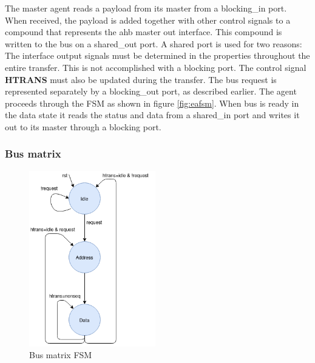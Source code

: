 The master agent reads a payload from its master from a blocking\_in port. When received,  the payload is added together with other control signals to a compound that represents the ahb master out interface. This compound is written to the bus on a shared\_out port. A shared port is used for two reasons: The interface output signals must be determined in the properties throughout the entire transfer. This is not accomplished with a blocking port. The control signal \textbf{HTRANS} must also be updated during the transfer. The bus request is represented separately by a blocking\_out port, as described earlier. The agent proceeds through the FSM as shown in figure \ref{fig:eafsm}. When bus is ready in the data state it reads the status and data from a shared\_in port and writes it out to its master through a blocking port.  

\subsubsection{Bus matrix}
\begin{figure}
\includegraphics[width=5.5cm]{figs/ESL/Bus_fsm_new.png}
\caption{Bus matrix FSM}\label{fig:busfsm}
\end{figure}

